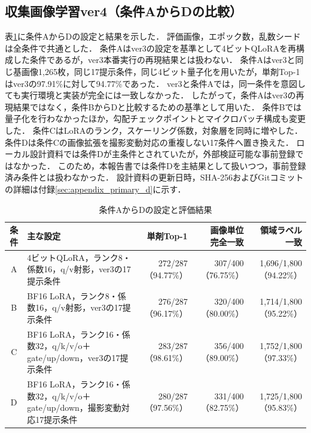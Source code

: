 \documentclass[uplatex,dvipdfmx]{jsarticle}
\begin{document}
\subsection{収集画像学習ver4（条件AからDの比較）}\label{sec:ver4_conditions}

表\ref{tab:conditions}に条件AからDの設定と結果を示した．
評価画像，エポック数，乱数シードは全条件で共通とした．
条件Aはver3の設定を基準として4ビットQLoRAを再構成した条件であるが，ver3本番実行の再現結果とは扱わない．
条件Aはver3と同じ基画像1,265枚，同じ17提示条件，同じ4ビット量子化を用いたが，単剤Top-1はver3の97.91\%に対して94.77\%であった．
ver3と条件Aでは，同一条件を意図しても実行環境と実装が完全には一致しなかった．
したがって，条件Aはver3の再現結果ではなく，条件BからDと比較するための基準として用いた．
条件Bでは量子化を行わなかったほか，勾配チェックポイントとマイクロバッチ構成も変更した．
条件CはLoRAのランク，スケーリング係数，対象層を同時に増やした．
条件Dは条件Cの画像拡張を撮影変動対応の重複しない17条件へ置き換えた．
ローカル設計資料では条件Dが主条件とされていたが，外部検証可能な事前登録ではなかった．
このため，本報告書では条件Dを主結果として扱いつつ，事前登録済み条件とは扱わなかった．
設計資料の更新日時，SHA-256およびGitコミットの詳細は付録\ref{sec:appendix_primary_d}に示す．

\begin{table}[H]
  \centering
  \caption{条件AからDの設定と評価結果}
  \label{tab:conditions}
  \scriptsize
  \begin{tabular}{|c|p{4.9cm}|r|r|r|}
    \hline
    条件 & 主な設定 & 単剤Top-1 & \shortstack{画像単位\\完全一致} & \shortstack{領域ラベル\\一致} \\ \hline
    A & 4ビットQLoRA，ランク8・係数16，q/v射影，ver3の17提示条件 & 272/287（94.77\%） & 307/400（76.75\%） & 1,696/1,800（94.22\%） \\ \hline
    B & BF16 LoRA，ランク8・係数16，q/v射影，ver3の17提示条件 & 276/287（96.17\%） & 320/400（80.00\%） & 1,714/1,800（95.22\%） \\ \hline
    C & BF16 LoRA，ランク16・係数32，q/k/v/o＋gate/up/down，ver3の17提示条件 & 283/287（98.61\%） & 356/400（89.00\%） & 1,752/1,800（97.33\%） \\ \hline
    D & BF16 LoRA，ランク16・係数32，q/k/v/o＋gate/up/down，撮影変動対応17提示条件 & 280/287（97.56\%） & 331/400（82.75\%） & 1,725/1,800（95.83\%） \\ \hline
  \end{tabular}
\end{table}
\end{document}
